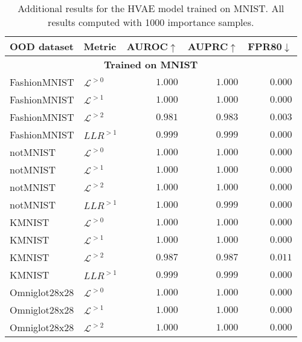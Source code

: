 {\begin{table}[t]
    \caption[Additional results for the HVAE model trained on MNIST]{Additional results for the HVAE model trained on MNIST. All results computed with 1000 importance samples.}
    \centering
    \begin{tabular}{llrrr}
        \toprule
         OOD dataset & Metric & AUROC$\uparrow$ & AUPRC$\uparrow$ & FPR80$\downarrow$ \\
         \midrule
         \multicolumn{5}{c}{\textbf{Trained on MNIST}} \\
         \midrule
FashionMNIST                     &  $\mathcal{L}^{>0}$  &  $1.000$  &  $1.000$  &  $0.000$ \\
FashionMNIST                     &  $\mathcal{L}^{>1}$  &  $1.000$  &  $1.000$  &  $0.000$ \\
FashionMNIST                     &  $\mathcal{L}^{>2}$  &  $0.981$  &  $0.983$  &  $0.003$ \\
FashionMNIST                   &  $LLR^{>1}$  &  $0.999$  &  $0.999$  &  $0.000$ \\
\midrule
notMNIST                         &  $\mathcal{L}^{>0}$  &  $1.000$  &  $1.000$  &  $0.000$ \\
notMNIST                         &  $\mathcal{L}^{>1}$  &  $1.000$  &  $1.000$  &  $0.000$ \\
notMNIST                         &  $\mathcal{L}^{>2}$  &  $1.000$  &  $1.000$  &  $0.000$ \\
notMNIST                       &  $LLR^{>1}$  &  $1.000$  &  $0.999$  &  $0.000$ \\
\midrule
KMNIST                           &  $\mathcal{L}^{>0}$  &  $1.000$  &  $1.000$  &  $0.000$ \\
KMNIST                           &  $\mathcal{L}^{>1}$  &  $1.000$  &  $1.000$  &  $0.000$ \\
KMNIST                           &  $\mathcal{L}^{>2}$  &  $0.987$  &  $0.987$  &  $0.011$ \\
KMNIST                         &  $LLR^{>1}$  &  $0.999$  &  $0.999$  &  $0.000$ \\
\midrule
Omniglot28x28                    &  $\mathcal{L}^{>0}$  &  $1.000$  &  $1.000$  &  $0.000$ \\
Omniglot28x28                    &  $\mathcal{L}^{>1}$  &  $1.000$  &  $1.000$  &  $0.000$ \\
Omniglot28x28                    &  $\mathcal{L}^{>2}$  &  $1.000$  &  $1.000$  &  $0.000$ \\

\end{tabular}
\end{table}}
